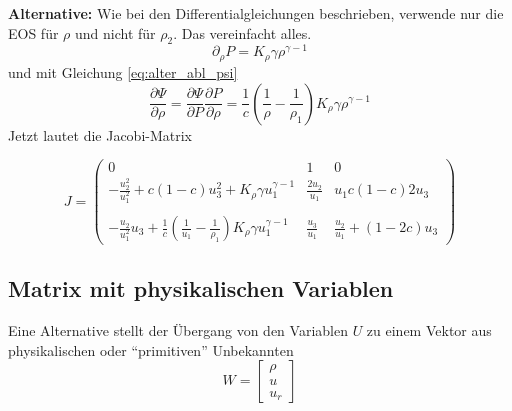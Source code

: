 {\bf Alternative:} Wie bei den Differentialgleichungen beschrieben,
verwende nur die EOS für $\rho$ und nicht für $\rho_2$. Das vereinfacht alles.
\begin{equation}
\partial_{\rho} P =  K_\rho \gamma \rho^{\gamma-1}
\end{equation}
und mit Gleichung \ref{eq:alter_abl_psi}
\begin{equation}
\frac{\partial \Psi}{\partial \rho} =
\frac{\partial \Psi}{\partial P}\frac{\partial P}{\partial \rho} 
=
\frac{1}{c}\left(\frac{1}{\rho}-\frac{1}{\rho_1} \right) K_\rho \gamma \rho^{\gamma-1}
\end{equation}
Jetzt lautet die Jacobi-Matrix

\begin{equation}
J = \left(\begin{array}{ccc}
0 & 1 & 0\\
- \frac{u_2^2}{u_1^2} + c (1-c) u_3^2  + K_\rho \gamma u_1^{\gamma-1}
& \frac{2 u_2}{u_1}  &  
u_1 c (1-c) 2 u_3  \\
\\
- \frac{u_2}{u_1^2} u_3 +
\frac{1}{c}\left(\frac{1}{u_1}-\frac{1}{\rho_1} \right) K_\rho \gamma u_1^{\gamma-1}
&   \frac{u_3}{u_1}  &  
\frac{u_2}{u_1} + (1-2c) u_3 
\end{array}\right)\label{eq:jacobi_v3}
\end{equation}

\subsection{ Matrix mit physikalischen Variablen}

Eine Alternative stellt der Übergang von den Variablen $U$ zu einem
Vektor aus physikalischen oder ``primitiven'' Unbekannten
\begin{equation}
W = \left[\begin{array}{c}\rho \\ u \\ u_r\end{array}\right]
\end{equation}

